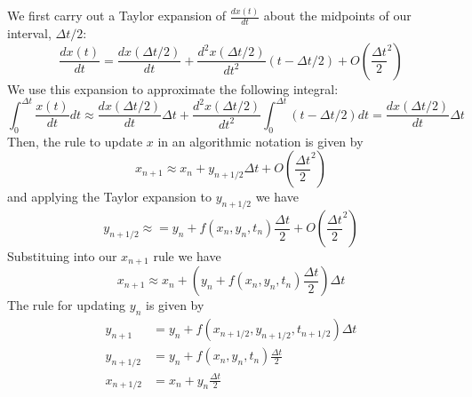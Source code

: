 \documentclass[12pt, a4paper, oneside, openright, titlepage]{book}
\begin{document}
\begin{proc}
        We first carry out a Taylor expansion of $\frac{dx(t)}{dt}$ about the midpoints of our interval, $\Delta t/2$: \begin{equation}
                \frac{dx(t)}{dt} = \frac{dx(\Delta t/2)}{dt} + \frac{d^2x(\Delta t/2)}{dt^2}(t - \Delta t/2) + O\left(\frac{\Delta t}{2}^2\right)
        \end{equation}
        We use this expansion to approximate the following integral:\begin{equation}
                \int_{0}^{\Delta t}\frac{x(t)}{dt}dt \approx \frac{dx(\Delta t/2)}{dt}\Delta t + \frac{d^2x(\Delta t/2)}{dt^2}\int_{0}^{\Delta t}(t-\Delta t/2)dt = \frac{dx(\Delta t/2)}{dt}\Delta t
        \end{equation}
        Then, the rule to update $x$ in an algorithmic notation is given by \begin{equation}
                x_{n+1} \approx x_n + y_{n+1/2}\Delta t + O\left(\frac{\Delta t}{2}^2\right)
        \end{equation}
        and applying the Taylor expansion to $y_{n+1/2}$ we have \begin{equation}
                y_{n+1/2} \approx = y_n + f(x_n,y_n,t_n)\frac{\Delta t}{2} + O\left(\frac{\Delta t}{2}^2\right)
        \end{equation}
        Substituing into our $x_{n+1}$ rule we have \begin{equation}
                x_{n+1} \approx x_n + \left( y_n + f(x_n,y_n,t_n)\frac{\Delta t}{2}\right)\Delta t
        \end{equation}
        The rule for updating $y_n$ is given by \begin{align}
                y_{n+1} &= y_n + f(x_{n+1/2},y_{n+1/2},t_{n+1/2})\Delta t \\
                y_{n+1/2} &= y_n + f(x_n,y_n,t_n)\frac{\Delta t}{2} \\
                x_{n+1/2} &= x_n + y_n\frac{\Delta t}{2} 
        \end{align}
\end{proc}
\end{document}

